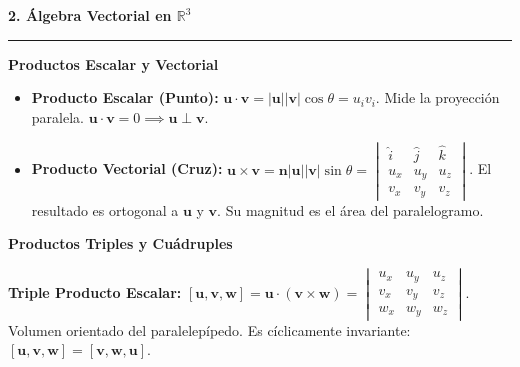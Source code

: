 \documentclass[10pt, landscape, twocolumn]{article}
\newcommand{\cheatsheetsection}[1]{
    \vspace{0.8em}
    {\color{themeblue}\large\bfseries #1} \par
    \vspace{-0.4em}
    {\color{themeblue}\rule{\linewidth}{1pt}} \par
    \vspace{0.3em}
}
\newcommand{\cheatsheetsubsection}[1]{
    \vspace{0.5em}
    {\color{themeblue}\normalsize\bfseries #1} \par
    \vspace{0.2em}
}
\begin{document}
\cheatsheetsection{2. Álgebra Vectorial en $\mathbb{R}^3$}

\cheatsheetsubsection{Productos Escalar y Vectorial}
\begin{itemize}[leftmargin=*, nosep]
    \item \textbf{Producto Escalar (Punto):} $\mathbf{u} \cdot \mathbf{v} = |\mathbf{u}||\mathbf{v}|\cos\theta = u_i v_i$. Mide la proyección paralela. $\mathbf{u} \cdot \mathbf{v} = 0 \implies \mathbf{u} \perp \mathbf{v}$.
    \item \textbf{Producto Vectorial (Cruz):} $\mathbf{u} \times \mathbf{v} = \mathbf{n} |\mathbf{u}||\mathbf{v}|\sin\theta = \begin{vmatrix} \hat{i} & \hat{j} & \hat{k} \\ u_x & u_y & u_z \\ v_x & v_y & v_z \end{vmatrix}$. El resultado es ortogonal a $\mathbf{u}$ y $\mathbf{v}$. Su magnitud es el área del paralelogramo.
\end{itemize}

\begin{center}
\end{center}

\cheatsheetsubsection{Productos Triples y Cuádruples}
\textbf{Triple Producto Escalar:} $[\mathbf{u}, \mathbf{v}, \mathbf{w}] = \mathbf{u} \cdot (\mathbf{v} \times \mathbf{w}) = \begin{vmatrix} u_x & u_y & u_z \\ v_x & v_y & v_z \\ w_x & w_y & w_z \end{vmatrix}$. Volumen orientado del paralelepípedo. Es cíclicamente invariante: $[\mathbf{u}, \mathbf{v}, \mathbf{w}] = [\mathbf{v}, \mathbf{w}, \mathbf{u}]$.
\end{document}
